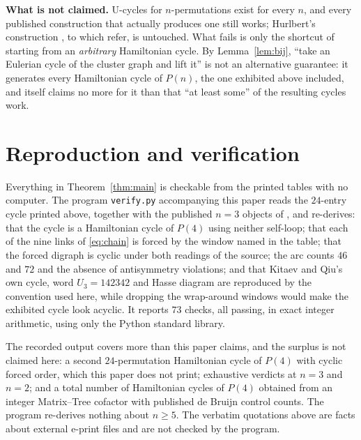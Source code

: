 \documentclass[11pt]{amsart}
\begin{document}
\medskip\noindent\textbf{What is not claimed.} U-cycles for $n$-permutations
exist for every $n$, and every published construction that actually produces
one still works; Hurlbert's construction \cite{Hurlbert}, to which
\cite{CDG1992} refer, is untouched. What fails is only the
shortcut of starting from an \emph{arbitrary} Hamiltonian cycle. By
Lemma~\ref{lem:bij}, ``take an Eulerian cycle of the cluster graph and lift
it'' \cite{KQ2026} is not an alternative guarantee: it generates every
Hamiltonian cycle of $P(n)$, the one exhibited above included, and
\cite{KQ2026} itself claims no more for it than that ``at least some'' of the
resulting cycles work.

\section{Reproduction and verification}

Everything in Theorem~\ref{thm:main} is checkable from the printed tables with
no computer. The program \texttt{verify.py} accompanying this paper reads the
$24$-entry cycle printed above, together with the published $n=3$ objects of
\cite{KQ2024}, and re-derives: that the cycle is a Hamiltonian cycle of $P(4)$
using neither self-loop; that each of the nine links of \eqref{eq:chain} is
forced by the window named in the table; that the forced digraph is cyclic under
both readings of the source; the arc counts $46$ and $72$ and the absence of
antisymmetry violations; and that Kitaev and Qiu's own cycle, word
$U_3=142342$ and Hasse diagram are reproduced by the convention used here, while
dropping the wrap-around windows would make the exhibited cycle look acyclic. It
reports $73$ checks, all passing, in exact integer arithmetic, using only the
Python standard library.

The recorded output covers more than this paper claims, and the surplus is not
claimed here: a second $24$-permutation Hamiltonian cycle of $P(4)$ with cyclic
forced order, which this paper does not print; exhaustive verdicts at $n=3$ and
$n=2$; and a total number of Hamiltonian cycles of $P(4)$ obtained from an
integer Matrix--Tree cofactor with published de Bruijn control counts. The
program re-derives nothing about $n\ge5$. The verbatim quotations above are
facts about external e-print files and are not checked by the program.
\end{document}

